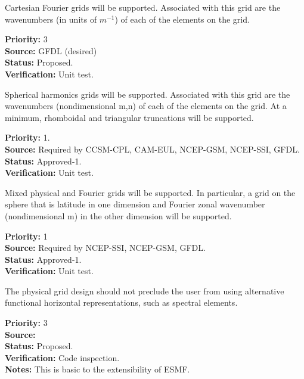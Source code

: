 Cartesian Fourier grids will be supported.  Associated with this grid are the
wavenumbers (in units of $m^{-1}$) of each of the elements on the grid.
\begin{reqlist}
{\bf Priority:} 3 \\
{\bf Source:} GFDL (desired)\\
{\bf Status:} Proposed. \\
{\bf Verification:} Unit test.
\end{reqlist}

Spherical harmonics grids will be supported.  Associated with this grid are the
wavenumbers (nondimensional m,n) of each of the elements on the grid.  At a
minimum, rhomboidal and triangular truncations will be supported.
\begin{reqlist}
{\bf Priority:} 1. \\
{\bf Source:} Required by CCSM-CPL, CAM-EUL, NCEP-GSM, NCEP-SSI, GFDL. \\
{\bf Status:} Approved-1. \\
{\bf Verification:} Unit test.
\end{reqlist}

Mixed physical and Fourier grids will be supported. In particular, a grid on the
sphere that is latitude in one dimension and Fourier zonal wavenumber
(nondimensional m) in the other dimension will be supported.
\begin{reqlist}
{\bf Priority:} 1 \\
{\bf Source:} Required by NCEP-SSI, NCEP-GSM, GFDL. \\
{\bf Status:} Approved-1. \\
{\bf Verification:} Unit test.
\end{reqlist}

The physical grid design should not preclude the user from using alternative
functional horizontal representations, such as spectral elements.
\begin{reqlist}
{\bf Priority:} 3 \\
{\bf Source:} \\
{\bf Status:} Proposed. \\
{\bf Verification:} Code inspection. \\
{\bf Notes:} This is basic to the extensibility of ESMF.
\end{reqlist}

